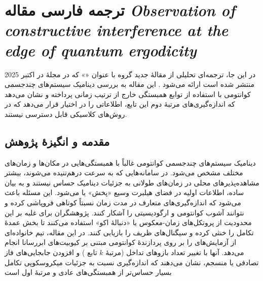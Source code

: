 
\chapter{ترجمه فارسی مقاله \textit{Observation of constructive interference at the edge of quantum ergodicity}}
\label{chap:otoc-translation}

\graphicspath{{figs/}}

در این جا، ترجمه‌ای تحلیلی از مقالهٔ جدید گروه  با عنوان «» که در مجلهٔ  در اکتبر 2025 منتشر شده است ارائه می‌شود \cite{google2025observation}. این مقاله به بررسی دینامیک سیستم‌های چندجسمی کوانتومی با استفاده از توابع همبستگی خارج از ترتیب زمانی  پرداخته و نشان می‌دهد که اندازه‌گیری‌های مرتبهٔ دوم این تابع، اطلاعاتی را در اختیار قرار می‌دهد که در روش‌های کلاسیکی قابل دسترسی نیستند.

\section{مقدمه و انگیزهٔ پژوهش}

دینامیک سیستم‌های چندجسمی کوانتومی غالباً با همبستگی‌هایی در مکان‌ها و زمان‌های مختلف مشخص می‌شود. در سامانه‌هایی که به سرعت درهم‌تنیده می‌شوند، بیشتر مشاهده‌پذیرهای محلی در زمان‌های طولانی به جزئیات دینامیک حساس نیستند و به بیان ساده، اطلاعات اولیه در فضای هیلبرت وسیع «پخش» یا  می‌شود. این مسئله باعث می‌شود که اندازه‌گیری‌های متعارف در مدت زمان نسبتاً کوتاهی فروپاشی کرده و نتوانند آشوب کوانتومی و ارگودیسیتی را آشکار کنند.  پژوهشگران برای غلبه بر این محدودیت از پروتکل‌های زمان-معکوس یا «دنبالهٔ اکو» استفاده می‌کنند تا بخش عمدهٔ تکامل را خنثی کرده و سیگنال‌های ظریف را بازیابی کنند.
در این مقاله، تیم  خانواده‌ای از آزمایش‌های  را بر روی پردازندهٔ کوانتومی مبتنی بر کیوبیت‌های ابررسانا انجام می‌دهد. آنها با تغییر تعداد بازوهای تداخل (مرتبهٔ \(k\) تابع ) و افزودن جابجایی‌های فاز تصادفی یا منسجم، نشان می‌دهند که اندازه‌گیری  نسبت به جزئیات میکروسکوپی تکامل بسیار حساس‌تر از همبستگی‌های عادی و مرتبهٔ اول است

